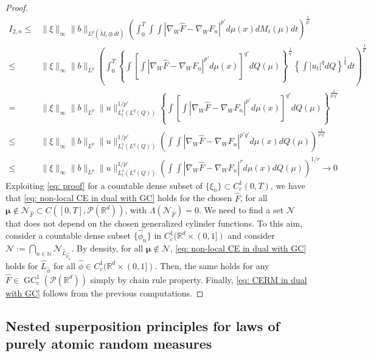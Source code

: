 \documentclass[10pt,leqno]{amsart}
\numberwithin{equation}{section}
\newcommand{\R}{\mathbb{R}}
\newcommand{\Q}{\mathbb{Q}}
\newcommand{\N}{\mathbb{N}}
\newcommand{\PP}{\mathcal{P}}
\renewcommand{\Q}{Q}
\begin{document}
\begin{proof}
\begin{align*}
    I_{2,n}
        \leq &
        \|\xi\|_\infty \|b\|_{L^p(\tilde{M}_t\otimes dt)} \left(\int_0^T \int\int | \nabla_W \hat{F}-\nabla_W F_n|^{p'} d\mu(x) dM_t(\mu) dt\right)^{\frac{1}{p'}}
        \\
        \leq &
        \|\xi\|_\infty \|b\|_{L^p} \left( \int_0^T \left\{\int \left[\int |\nabla_W \hat{F}-\nabla_W F_n|^{p'} d\mu(x)\right]^{q'} d\Q(\mu)\right\}^{\frac{1}{q'}} \left\{\int |u_t|^q d\Q \right\}^{\frac1q} dt \right)^{\frac{1}{p'}}
        \\
        = & \|\xi\|_\infty \|b\|_{L^p}\|u\|_{L^1_t(L^q(\Q))}^{1/p'}\left\{\int \left[\int |\nabla_W \hat{F}-\nabla_W F_n |^{p'} d\mu(x)\right]^{q'} d\Q(\mu)\right\}^{\frac{1}{p'q'}}
        \\
        \leq &
        \|\xi\|_\infty \|b\|_{L^p}\|u\|_{L^1_t(L^q(\Q))}^{1/p'}\left(\int \int |\nabla_W\hat{F}-\nabla_WF_n |^{p'q'}d\mu(x)d\Q(\mu)\right)^{\frac{1}{p'q'}}
        \\
        \leq &
        \|\xi\|_\infty \|b\|_{L^p}\|u\|_{L^1_t(L^q(\Q))}^{1/p'}\left(\int \int |\nabla_W\hat{F}-\nabla_WF_n |^{r}d\mu(x)d\Q(\mu)\right)^{1/r} \to 0
\end{align*}
Exploiting \eqref{eq: proof} for a countable dense subset of $\{\xi_n\}\subset C_c^1(0,T)$, we have that \eqref{eq: non-local CE in dual with GC} holds for the chosen $\hat{F}$, for all $\boldsymbol{\mu} \notin \mathcal{N}_{\hat{F}} \subset C([0,T],\PP(\R^d))$, with $\Lambda(\mathcal{N}_{\hat{F}}) = 0$.  We need to find a set $\mathcal{N}$ that does not depend on the chosen generalized cylinder functions. To this aim, consider a countable dense subset $\{\hat{\phi}_n\}$ in $C_c^1(\R^d \times (0,1])$ and consider $\mathcal{N}:= \bigcap_{n\in \N} \mathcal{N}_{\hat{L}_{\hat{\phi}_n}}$. By density, for all $\boldsymbol{\mu}\notin \mathcal{N}$, \eqref{eq: non-local CE in dual with GC} holds for $\hat{L}_{\hat{\phi}}$ for all $\hat{\phi} \in C_c^1(\R^d\times (0,1])$. Then, the same holds for any $\hat{F}\in \operatorname{GC}_c^1(\PP(\R^d))$ simply by chain rule property.
Finally, \eqref{eq: CERM in dual with GC} follows from the previous computations.
\end{proof}




\subsection{Nested superposition principles for laws of purely atomic random measures}\label{subsec: nested atomic}
\end{document}
